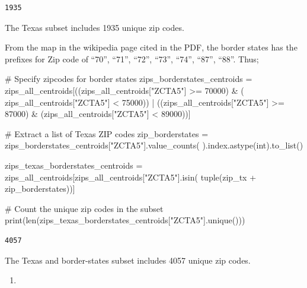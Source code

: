 \documentclass[
  letterpaper,
  DIV=11,
  numbers=noendperiod]{scrartcl}
\newenvironment{Shaded}{\begin{snugshade}}{\end{snugshade}}
\newcommand{\BuiltInTok}[1]{\textcolor[rgb]{0.00,0.23,0.31}{#1}}
\newcommand{\CommentTok}[1]{\textcolor[rgb]{0.37,0.37,0.37}{#1}}
\newcommand{\DecValTok}[1]{\textcolor[rgb]{0.68,0.00,0.00}{#1}}
\newcommand{\NormalTok}[1]{\textcolor[rgb]{0.00,0.23,0.31}{#1}}
\newcommand{\OperatorTok}[1]{\textcolor[rgb]{0.37,0.37,0.37}{#1}}
\newcommand{\StringTok}[1]{\textcolor[rgb]{0.13,0.47,0.30}{#1}}
\providecommand{\tightlist}{%
  \setlength{\itemsep}{0pt}\setlength{\parskip}{0pt}}\usepackage{longtable,booktabs,array}
\begin{document}
\begin{verbatim}
1935
\end{verbatim}

The Texas subset includes 1935 unique zip codes.

From the map in the wikipedia page cited in the PDF, the border states
has the prefixes for Zip code of ``70'', ``71'', ``72'', ``73'', ``74'',
``87'', ``88''. Thus;

\begin{Shaded}
\begin{Highlighting}[]
\CommentTok{\# Specify zipcodes for border states}
\NormalTok{zips\_borderstates\_centroids }\OperatorTok{=}\NormalTok{ zips\_all\_centroids[((zips\_all\_centroids[}\StringTok{"ZCTA5"}\NormalTok{] }\OperatorTok{\textgreater{}=} \DecValTok{70000}\NormalTok{) }\OperatorTok{\&}\NormalTok{ (}
\NormalTok{    zips\_all\_centroids[}\StringTok{"ZCTA5"}\NormalTok{] }\OperatorTok{\textless{}} \DecValTok{75000}\NormalTok{)) }\OperatorTok{|}\NormalTok{ ((zips\_all\_centroids[}\StringTok{"ZCTA5"}\NormalTok{] }\OperatorTok{\textgreater{}=} \DecValTok{87000}\NormalTok{) }\OperatorTok{\&}\NormalTok{ (zips\_all\_centroids[}\StringTok{"ZCTA5"}\NormalTok{] }\OperatorTok{\textless{}} \DecValTok{89000}\NormalTok{))]}

\CommentTok{\# Extract a list of Texas ZIP codes}
\NormalTok{zip\_borderstates }\OperatorTok{=}\NormalTok{ zips\_borderstates\_centroids[}\StringTok{"ZCTA5"}\NormalTok{].value\_counts(}
\NormalTok{).index.astype(}\BuiltInTok{int}\NormalTok{).to\_list()}

\NormalTok{zips\_texas\_borderstates\_centroids }\OperatorTok{=}\NormalTok{ zips\_all\_centroids[zips\_all\_centroids[}\StringTok{"ZCTA5"}\NormalTok{].isin(}
    \BuiltInTok{tuple}\NormalTok{(zip\_tx }\OperatorTok{+}\NormalTok{ zip\_borderstates))]}

\CommentTok{\# Count the unique zip codes in the subset}
\BuiltInTok{print}\NormalTok{(}\BuiltInTok{len}\NormalTok{(zips\_texas\_borderstates\_centroids[}\StringTok{"ZCTA5"}\NormalTok{].unique()))}
\end{Highlighting}
\end{Shaded}

\begin{verbatim}
4057
\end{verbatim}

The Texas and border-states subset includes 4057 unique zip codes.

\begin{enumerate}
\def\labelenumi{\arabic{enumi}.}
\setcounter{enumi}{2}
\tightlist
\item
\end{enumerate}
\end{document}
